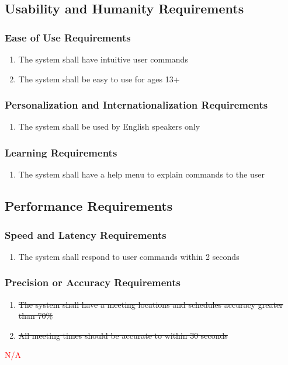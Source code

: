 \documentclass[12pt, titlepage]{article}
\begin{document}
\subsection{Usability and Humanity Requirements}
\subsubsection{Ease of Use Requirements}
\begin{enumerate}[start=1, label={UH\arabic*.}]
    \item The system shall have intuitive user commands
    \item The system shall be easy to use for ages 13+
\end{enumerate}
\subsubsection{Personalization and Internationalization Requirements}
\begin{enumerate}[start=3, label={UH\arabic*.}]
    \item The system shall be used by English speakers only
\end{enumerate}
\subsubsection{Learning Requirements}
\begin{enumerate}[start=4, label={UH\arabic*.}]
    \item The system shall have a help menu to explain commands to the user
\end{enumerate}

\subsection{Performance Requirements}
\subsubsection{Speed and Latency Requirements}
\begin{enumerate}[start=1, label={P\arabic*.}]
    \item The system shall respond to user commands within 2 seconds
\end{enumerate}
\subsubsection{Precision or Accuracy Requirements}
\begin{enumerate}[start=2, label={P\arabic*.}]
    \item \sout{The system shall have a meeting locations and schedules accuracy greater than 70\%}
    \item \sout{All meeting times should be accurate to within 30 seconds}
\end{enumerate}
\textcolor{red}{N/A}
\end{document}
